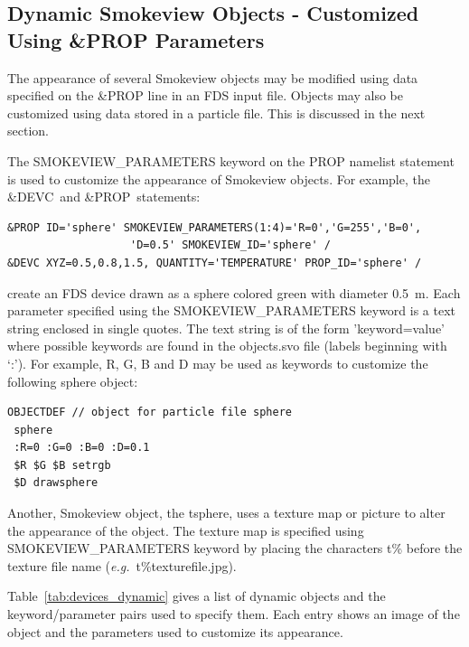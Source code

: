 \subsection{Dynamic Smokeview Objects - Customized Using \&PROP Parameters}
\label{info:SMOKEVIEW_PARAMETERS}

The appearance of several Smokeview objects may be modified using data specified on the {\ct \&PROP} line in an FDS input
file.  Objects may also be customized using data stored in a particle file.  This is discussed in the next section.

The {\ct SMOKEVIEW\_PARAMETERS} keyword on the {\ct PROP}
namelist statement is used to customize the appearance of Smokeview objects.  For example, the {\ct \&DEVC}\ and {\ct \&PROP}\ statements:

\begin{lstlisting}
&PROP ID='sphere' SMOKEVIEW_PARAMETERS(1:4)='R=0','G=255','B=0',
                   'D=0.5' SMOKEVIEW_ID='sphere' /
&DEVC XYZ=0.5,0.8,1.5, QUANTITY='TEMPERATURE' PROP_ID='sphere' /
\end{lstlisting}

\noindent
create an FDS device drawn as a sphere colored green with diameter 0.5~m. Each parameter specified using the
{\ct SMOKEVIEW\_PARAMETERS} keyword
is a text string enclosed in single quotes.  The text string is of the form {\ct 'keyword=value'} where possible
keywords are found in the {\ct objects.svo} file (labels beginning with `:').  For example, {\ct R}, {\ct G},
{\ct B} and {\ct D} may be used as keywords to customize the following {\ct sphere} object:

\begin{lstlisting}
OBJECTDEF // object for particle file sphere
 sphere
 :R=0 :G=0 :B=0 :D=0.1
 $R $G $B setrgb
 $D drawsphere
\end{lstlisting}

\noindent Another, Smokeview object, the {\ct tsphere}, uses a texture map or picture to alter the appearance of the object.
The texture map is specified using {\ct SMOKEVIEW\_PARAMETERS} keyword by placing the characters {\ct t\%}
before the texture file name ({\em e.g.}\ {\ct t\%texturefile.jpg}).

Table~\ref{tab:devices_dynamic} gives a list of dynamic objects and the keyword/parameter pairs used to specify them.
Each entry shows an image of the object and the parameters used to customize its appearance.

